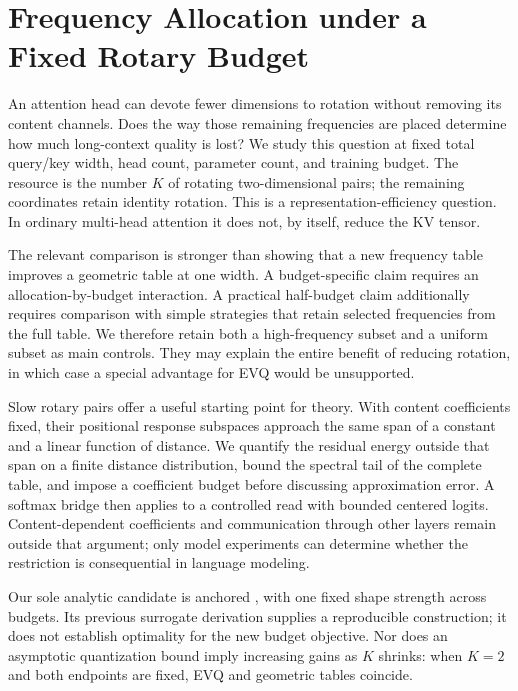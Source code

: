\section{Frequency Allocation under a Fixed Rotary Budget}
\label{sec:intro}

An attention head can devote fewer dimensions to rotation without removing its
content channels. Does the way those remaining frequencies are placed determine
how much long-context quality is lost? We study this question at fixed total
query/key width, head count, parameter count, and training budget. The resource
is the number $K$ of rotating two-dimensional pairs; the remaining coordinates
retain identity rotation. This is a representation-efficiency question. In
ordinary multi-head attention it does not, by itself, reduce the KV tensor.

The relevant comparison is stronger than showing that a new frequency table
improves a geometric table at one width. A budget-specific claim requires an
allocation-by-budget interaction. A practical half-budget claim additionally
requires comparison with simple strategies that retain selected frequencies
from the full table. We therefore retain both a high-frequency subset and a
uniform subset as main controls. They may explain the entire benefit of reducing
rotation, in which case a special advantage for EVQ would be unsupported.

Slow rotary pairs offer a useful starting point for theory. With content
coefficients fixed, their positional response subspaces approach the same
span of a constant and a linear function of distance. We quantify the residual
energy outside that span on a finite distance distribution, bound the spectral
tail of the complete table, and impose a coefficient budget before discussing
approximation error. A softmax bridge then applies to a controlled read with
bounded centered logits. Content-dependent coefficients and communication
through other layers remain outside that argument; only model experiments can
determine whether the restriction is consequential in language modeling.

Our sole analytic candidate is anchored \evq{}, with one fixed shape strength
across budgets. Its previous surrogate derivation supplies a reproducible
construction; it does not establish optimality for the new budget objective.
Nor does an asymptotic quantization bound imply increasing gains as $K$ shrinks:
when $K=2$ and both endpoints are fixed, EVQ and geometric tables coincide.

